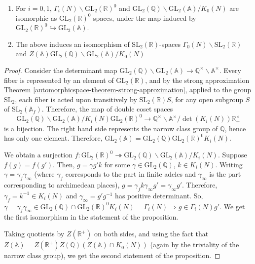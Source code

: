 \begin{lemma}
\label{lemma-GR-orbit}
	\begin{enumerate}
	\item For $i = 0, 1$, $\Gamma_{i}(N) \backslash \text{GL}_{2}(\mathbb{R})^0$ and $\text{GL}_{2}(\mathbb{Q}) \backslash \text{GL}_{2}(\mathbb{A})/K_0(N)$ are isomorphic as $\text{GL}_2(\mathbb R)^0$-spaces, under the map induced by $\text{GL}_{2}(\mathbb{R})^0 \hookrightarrow \text{GL}_{2}(\mathbb{A})$. 
	\item The above induces an isomorphism of $\text{SL}_2(\mathbb R)$-spaces $\Gamma_{0}(N) \backslash \text{SL}_{2}(\mathbb{R})$ and $Z(\mathbb{A})\text{GL}_{2}(\mathbb{Q}) \backslash \text{GL}_{2}(\mathbb{A})/K_{0}(N)$
\end{enumerate}
\end{lemma}

\begin{proof}
	
	Consider the determinant map $\text{GL}_{2}(\mathbb{Q})\backslash \text{GL}_2(\mathbb A)\to \mathbb Q^\times\backslash \mathbb A^\times$. Every fiber is represented by an element of $\text{GL}_{2}(\mathbb{R})$, and by the strong approximation Theorem \ref{automorphicspace-theorem-strong-approximation}, applied to the group $\text{SL}_2$, each fiber is acted upon transitively by $\text{SL}_2(\mathbb R) S$, for any open subgroup $S$ of $\text{SL}_2(\mathbb A_f)$. Therefore, the map of double coset spaces
$$\text{GL}_{2}(\mathbb{Q}) \backslash \text{GL}_{2}(\mathbb{A})/K_{i}(N)\text{GL}_{2}(\mathbb{R})^0 \to \mathbb Q^\times \backslash \mathbb A^\times/\det(K_{i}(N))\mathbb R^\times_+$$
is a bijection. The right hand side represents the narrow class group of $\mathbb Q$, hence has only one element. Therefore, $\text{GL}_{2}(\mathbb{A}) = \text{GL}_{2}(\mathbb{Q}) \text{GL}_{2}(\mathbb{R})^0 K_{i}(N)$.
	
	We obtain a surjection $f: \text{GL}_{2}(\mathbb{R})^0 \twoheadrightarrow \text{GL}_{2}(\mathbb{Q}) \backslash \text{GL}_{2}(\mathbb{A})/K_{i}(N)$. Suppose $f(g) = f(g')$. Then, $g = \gamma g' k$ for some $\gamma \in \text{GL}_{2}(\mathbb{Q})$, $k \in K_{i}(N)$. Writing $\gamma = \gamma_{f} \gamma_{\infty}$ (where $\gamma_{f}$ corresponds to the part in finite adeles and $\gamma_{\infty}$ is the part corresponding to archimedean places), $g = \gamma_{f} k \gamma_{\infty} g' = \gamma_{\infty} g'$. Therefore, $\gamma_{f} = k^{-1} \in K_{i}(N)$ and $\gamma_{\infty} = g' g^{-1}$ has positive determinant. So, $\gamma = \gamma_{f} \gamma_{\infty} \in \text{GL}_{2}(\mathbb{Q}) \cap \text{GL}_{2}(\mathbb{R})^0 K_{i}(N) = \Gamma_{i}(N) \Rightarrow g \in \Gamma_{i}(N) g'$. We get the first isomorphism in the statement of the proposition. 
	
Taking quotients by $Z(\mathbb{R}^{+})$ on both sides, and using the fact that $Z(\mathbb{A})  = Z(\mathbb{R}^{+}) Z(\mathbb{Q}) (Z(\mathbb{A}) \cap K_{0}(N))$ (again by the triviality of the narrow class group), we get the second statement of the proposition.
\end{proof}


